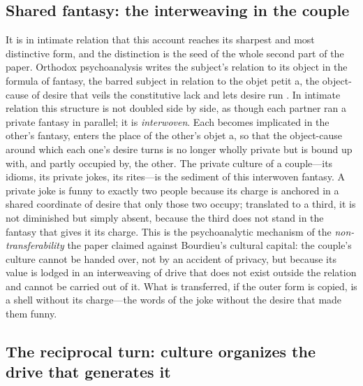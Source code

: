 \subsection*{Shared fantasy: the interweaving in the couple}

It is in intimate relation that this account reaches its sharpest and most distinctive form, and the distinction is the seed of the whole second part of the paper. Orthodox psychoanalysis writes the subject's relation to its object in the formula of fantasy, the barred subject in relation to the objet petit a, the object-cause of desire that veils the constitutive lack and lets desire run \parencite{lacan1977xi}. In intimate relation this structure is not doubled side by side, as though each partner ran a private fantasy in parallel; it is \emph{interwoven}. Each becomes implicated in the other's fantasy, enters the place of the other's objet a, so that the object-cause around which each one's desire turns is no longer wholly private but is bound up with, and partly occupied by, the other. The private culture of a couple---its idioms, its private jokes, its rites---is the sediment of this interwoven fantasy. A private joke is funny to exactly two people because its charge is anchored in a shared coordinate of desire that only those two occupy; translated to a third, it is not diminished but simply absent, because the third does not stand in the fantasy that gives it its charge. This is the psychoanalytic mechanism of the \emph{non-transferability} the paper claimed against Bourdieu's cultural capital: the couple's culture cannot be handed over, not by an accident of privacy, but because its value is lodged in an interweaving of drive that does not exist outside the relation and cannot be carried out of it. What is transferred, if the outer form is copied, is a shell without its charge---the words of the joke without the desire that made them funny.

\subsection*{The reciprocal turn: culture organizes the drive that generates it}


